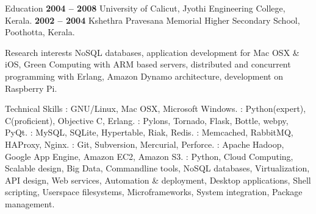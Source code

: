 \documentclass{resume}
\author{Sreejith Kesavan}
\begin{document}
\maketitle


\begin{category}{Education}
   \hfill \textbf{2004 -- 2008}
  \citemnobullet University of Calicut, Jyothi Engineering College, Kerala.
   \hfill \textbf{2002 -- 2004}
  \citemnobullet Kshethra Pravesana Memorial Higher Secondary School, Poothotta, Kerala.
\end{category}


\begin{category}{Research interests}
  \citemnobullet NoSQL databases, application development for Mac OSX \& iOS, Green Computing with 
  ARM based servers, distributed and concurrent programming with Erlang, Amazon Dynamo architecture, 
  development on Raspberry Pi.
\end{category}

\begin{category}{Technical Skills}
  : GNU/Linux, Mac OSX, Microsoft Windows.
  : Python(expert), C(proficient), Objective C, Erlang.
  : Pylons, Tornado, Flask, Bottle, webpy, PyQt.
  : MySQL, SQLite, Hypertable, Riak, Redis.
  : Memcached, RabbitMQ, HAProxy, Nginx.
  : Git, Subversion, Mercurial, Perforce.
  : Apache Hadoop, Google App Engine, Amazon EC2, Amazon S3.
  : Python, Cloud Computing, Scalable design, Big Data, Commandline 
  tools, NoSQL databases, Virtualization, API design, Web services, Automation \& deployment, 
  Desktop applications, Shell scripting, Userspace filesystems, Microframeworks, System integration, 
  Package management.
\end{category}

\end{document}
